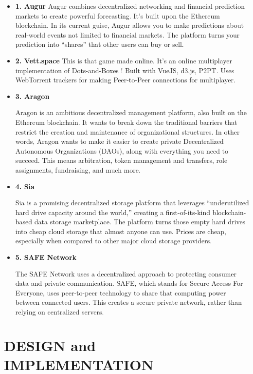 \documentclass{fisatproject}
\begin{document}
\begin{itemize}
	\item \textbf{1. Augur}
	Augur combines decentralized networking and financial prediction markets to create powerful forecasting. It’s built upon the Ethereum blockchain. In its current guise, Augur allows you to make predictions about real-world events not limited to financial markets. The platform turns your prediction into “shares” that other users can buy or sell.
	

	\item \textbf{2. Vett.space}
	This is that game made online. It's an online multiplayer implementation of Dots-and-Boxes !
	Built with VueJS, d3.js, P2PT. Uses WebTorrent trackers for making Peer-to-Peer connections for multiplayer.
	

	\item \textbf{3. Aragon}
	
	Aragon is an ambitious decentralized management platform, also built on the Ethereum blockchain. It wants to break down the traditional barriers that restrict the creation and maintenance of organizational structures. In other words, Aragon wants to make it easier to create private Decentralized Autonomous Organizations (DAOs), along with everything you need to succeed. This means arbitration, token management and transfers, role assignments, fundraising, and much more.

	\item \textbf{4. Sia}
	
	Sia is a promising decentralized storage platform that leverages “underutilized hard drive capacity around the world,” creating a first-of-its-kind blockchain-based data storage marketplace. The platform turns those empty hard drives into cheap cloud storage that almost anyone can use. Prices are cheap, especially when compared to other major cloud storage providers.
	
	\item \textbf{5. SAFE Network}
	
	The SAFE Network uses a decentralized approach to protecting consumer data and private communication. SAFE, which stands for Secure Access For Everyone, uses peer-to-peer technology to share that computing power between connected users. This creates a secure private network, rather than relying on centralized servers.
\end{itemize}


\chapter{DESIGN and IMPLEMENTATION}
\end{document}
